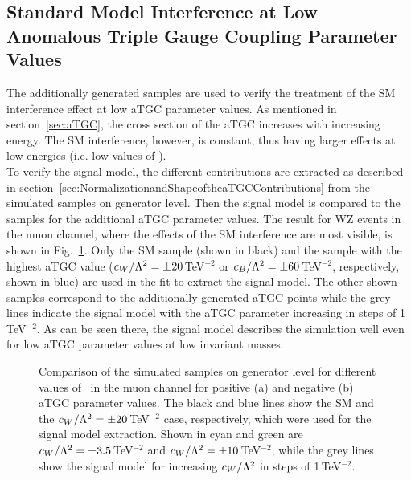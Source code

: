 \subsection{Standard Model Interference at Low Anomalous Triple Gauge Coupling Parameter Values}
\label{sec:SMint}
The additionally generated samples are used to verify the treatment of the SM interference effect at low aTGC parameter values. As mentioned in section~\ref{sec:aTGC}, the cross section of the aTGC increases with increasing energy. The SM interference, however, is constant, thus having larger effects at low energies (i.e. low values of \MWV).\\

\noindent To verify the signal model, the different contributions are extracted as described in section~\ref{sec:NormalizationandShapeoftheaTGCContributions} from the simulated samples on generator level. Then the signal model is compared to the samples for the additional aTGC parameter values. The result for WZ events in the muon channel, where the effects of the SM interference are most visible, is shown in Fig.~\ref{fig:signal:smintverif_WZ_mu}. Only the SM sample (shown in black) and the sample with the highest aTGC value ($c_{W}/\Lambda^2 = \pm 20$\,TeV$^{-2}$ or $c_{B}/\Lambda^2 = \pm 60$\,TeV$^{-2}$, respectively, shown in blue) are used in the fit to extract the signal model. The other shown samples correspond to the additionally generated aTGC points while the  grey lines indicate the signal model with the aTGC parameter increasing in steps of 1\,TeV$^{-2}$. As can be seen there, the signal model describes the simulation well even for low aTGC parameter values at low invariant masses.

\begin{figure}[bh!]
	\centering
	\caption[Comparison of the simulated samples on generator level for different values of \Tccw \ in the muon channel]{Comparison of the simulated samples on generator level for different values of \Tccw \ in the muon channel for positive (a) and negative (b) aTGC parameter values. The black and blue lines show the SM and the $c_{W}/\Lambda^2 = \pm 20$\,TeV$^{-2}$ case, respectively, which were used for the signal model extraction. Shown in cyan and green are $c_{W}/\Lambda^2 = \pm 3.5$\,TeV$^{-2}$ and $c_{W}/\Lambda^2 = \pm 10$\,TeV$^{-2}$, while the grey lines show the signal model for increasing $c_{W}/\Lambda^2$ in steps of 1\,TeV$^{-2}$.}
	\label{fig:signal:smintverif_WZ_mu}
\end{figure}